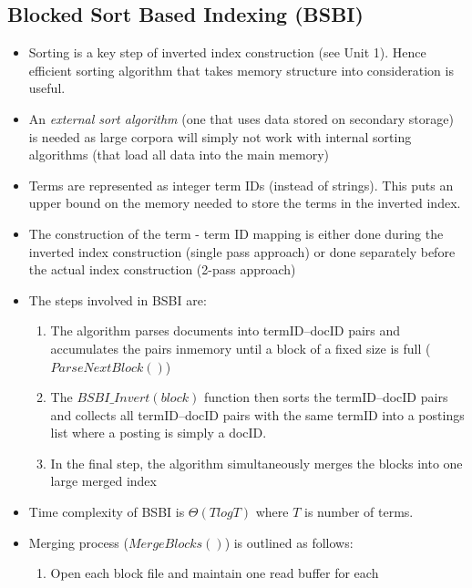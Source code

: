 \documentclass{article}
\begin{document}
\subsection{Blocked Sort Based Indexing (BSBI)}
\begin{itemize}
    \item Sorting is a key step of inverted index construction (see Unit 1). Hence efficient sorting algorithm that takes memory structure into consideration is useful.
    
    \item An \textit{external sort algorithm} (one that uses data stored on secondary storage) is needed as large corpora will simply not work with internal sorting algorithms (that load all data into the main memory) 
    
    \item Terms are represented as integer term IDs (instead of strings). This puts an upper bound on the memory needed to store the terms in the inverted index. 
    
    \item The construction of the term - term ID mapping is either done during the inverted index construction (single pass approach) or done separately before the actual index construction (2-pass approach)
    
    \item The steps involved in BSBI are:
    \begin{enumerate}
        \item The algorithm parses documents into termID–docID pairs and accumulates the pairs inmemory until a block of a fixed size is full ($ParseNextBlock()$)
        
        \item The $BSBI\_Invert(block)$ function then sorts the termID–docID pairs and collects all termID–docID pairs with the same termID into a postings list where a posting is simply a docID.
        
        \item In the final step, the algorithm simultaneously merges the blocks into one large merged index
    \end{enumerate}
    
    \item Time complexity of BSBI is $\Theta(T log T)$ where $T$ is number of terms. 
    
    \item Merging process ($MergeBlocks()$) is outlined as follows:
    \begin{enumerate}
        \item Open each block file and maintain one read buffer for each
        

\end{enumerate}
\end{itemize}
\end{document}
